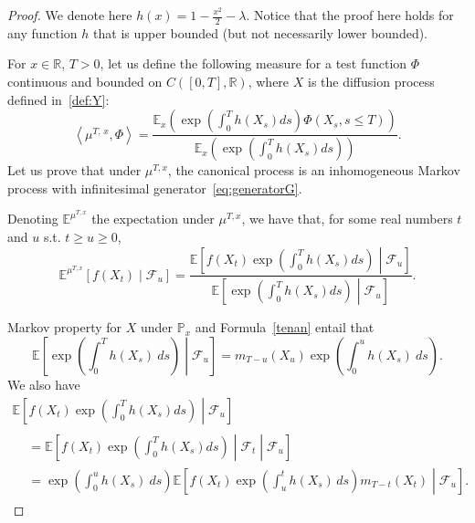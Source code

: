 \documentclass[AHL,Unicode,longabstracts,published]{cedram}
\newcommand{\Fo}{\mathcal{F}}
\renewcommand*\P{\mathbb{P}}
\newcommand*\R{\mathbb{R}}
\newcommand*\E{\mathbb{E}}
\begin{document}
\begin{proof}
We denote here $h(x)=1-\frac{x^2}{2}-\lambda$. Notice that the proof here holds for any function $h$ that is upper bounded (but not necessarily lower bounded).


For $x\in \R$, $T>0$, let us define the following measure for a test function $\Phi$ continuous and bounded on $C([0,T],\R)$, where $X$ is the diffusion process defined in~\eqref{def:Y}:
\begin{equation}
\left\langle \mu^{T,\,x},\Phi\right\rangle=\frac{\E_x\left(\exp\left(\int_0^T h(X_s)ds\right)\Phi\left(X_s,s\leq T\right)\right)}{\E_x\left(\exp\left(\int_0^T h(X_s)ds\right)\right)}.
\end{equation}
Let us prove that under $\mu^{T,x}$, the canonical process is an inhomogeneous Markov process with infinitesimal generator~\eqref{eq:generatorG}.

Denoting $\E^{\mu^{T,x}}$ the expectation under $\mu^{T,x}$, we have that, for some real numbers $t$ and $u$ s.t. $t\geq u\geq 0$,
\begin{equation}\label{eq:condEx}
\E^{\mu^{T, x}}\left[f\left(X_{t}\right)\middle| \Fo_{u} \right]=\frac{\E\left[f\left(X_{t}\right)\exp\left(\int_{0}^{T} h\left(X_{s}\right)ds \right)\middle| \Fo_{u} \right]}{\E\left[\exp\left(\int_{0}^{T} h\left(X_{s}\right)ds \right)\middle| \Fo_{u} \right]}.
\end{equation}

Markov property for $X$ under $\P_{x}$ and Formula~\eqref{tenan} entail that
\begin{equation}\label{trick}
\E\left[\exp\left(\int_{0}^{T}h(X_{s})\ ds \right)\middle| \Fo_{u}\right] = m_{T-u}(X_{u}) \exp\left(\int_{0}^{u}h(X_{s})\ ds\right).
\end{equation}
We also have
\begin{multline}\label{eq:markov}
\E\left[f\left(X_{t}\right)\exp\left(\int_{0}^{T}h\left(X_{s}\right)ds \right)\middle| \Fo_{u} \right]\\
\begin{aligned}
&= \E\left[f\left(X_{t}\right)\exp\left(\int_{0}^{T}h\left(X_{s}\right)ds \right)\middle| \Fo_{t} \middle| \Fo_{u} \right]\\
&= \exp\left(\int_{0}^{u}h(X_{s})\ ds\right)\E\left[f\left(X_{t}\right)\exp\left(\int_{u}^{t}h\left(X_{s}\right)\, ds \right)m_{T-t}\left(X_{t}\right)\middle| \Fo_{u} \right].
\end{aligned}
\end{multline}


\end{proof}
\end{document}
